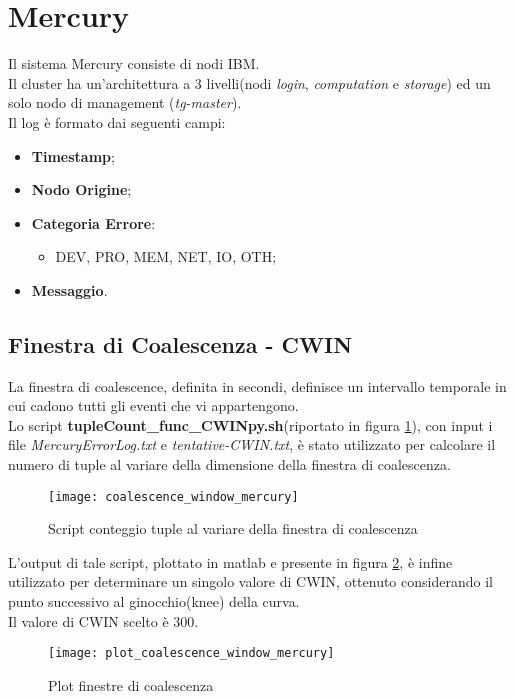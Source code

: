 \clearpage

\section{Mercury}
Il sistema Mercury consiste di nodi IBM.\\
Il cluster ha un'architettura a 3 livelli(nodi \textit{login}, \textit{computation}
e \textit{storage}) ed un solo nodo di management
(\textit{tg-master}).\\
Il log è formato dai seguenti campi:
\begin{itemize}
  \item \textbf{Timestamp};
  \item \textbf{Nodo Origine};
  \item \textbf{Categoria Errore}:
  \begin{itemize}
    \item DEV, PRO, MEM, NET, IO, OTH;
  \end{itemize}
  \item \textbf{Messaggio}.
\end{itemize}

\subsection{Finestra di Coalescenza - CWIN}
La finestra di coalescence, definita in secondi, definisce un intervallo temporale
in cui cadono tutti gli eventi che vi appartengono.\\
Lo script \textbf{tupleCount\_func\_CWINpy.sh}(riportato in figura \ref{coalescence_window_mercury}), con input i file \textit{MercuryErrorLog.txt}
e \textit{tentative-CWIN.txt}, è stato utilizzato per calcolare il numero di tuple al
variare della dimensione della finestra di coalescenza.\\

\begin{figure}[!htbp]
  \texttt{[image: coalescence\_window\_mercury]}
  \caption{Script conteggio tuple al variare della finestra di coalescenza}
  \label{coalescence_window_mercury}
\end{figure}

\clearpage

L'output di tale script, plottato in matlab e presente in figura \ref{plot_coalescence_window_mercury},
è infine utilizzato per determinare un singolo valore di CWIN, ottenuto
considerando il punto successivo al ginocchio(knee) della curva.\\
Il valore di CWIN scelto è 300.\\
\begin{figure}[!htbp]
  \texttt{[image: plot\_coalescence\_window\_mercury]}
  \caption{Plot finestre di coalescenza}
  \label{plot_coalescence_window_mercury}
\end{figure}

